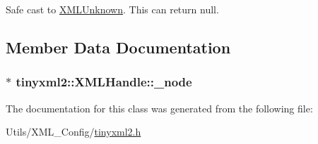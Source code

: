 Safe cast to \hyperlink{classtinyxml2_1_1_x_m_l_unknown}{X\-M\-L\-Unknown}. This can return null. 



\subsection{Member Data Documentation}
\hypertarget{classtinyxml2_1_1_x_m_l_handle_a65449d71b75d8aeb40a54224c954c138}{
\subsubsection[{\-\_\-node}]{$\ast$ tinyxml2\-::\-X\-M\-L\-Handle\-::\-\_\-node\hspace{0.3cm}{\ttfamily [private]}}}\label{classtinyxml2_1_1_x_m_l_handle_a65449d71b75d8aeb40a54224c954c138}


The documentation for this class was generated from the following file\-:\begin{DoxyCompactItemize}
\item 
Utils/\-X\-M\-L\-\_\-\-Config/\hyperlink{tinyxml2_8h}{tinyxml2.\-h}\end{DoxyCompactItemize}

